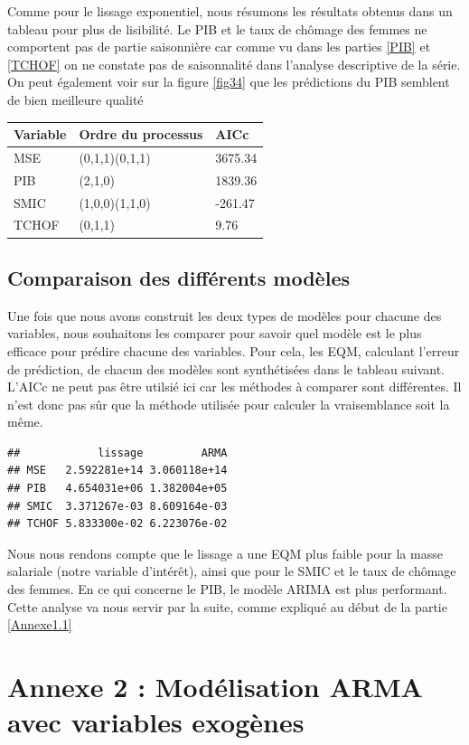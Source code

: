 \documentclass[11pt,]{article}
\begin{document}
Comme pour le lissage exponentiel, nous résumons les résultats obtenus
dans un tableau pour plus de lisibilité. Le PIB et le taux de chômage
des femmes ne comportent pas de partie saisonnière car comme vu dans les
parties \ref{PIB} et \ref{TCHOF} on ne constate pas de saisonnalité dans
l'analyse descriptive de la série. On peut également voir sur la figure
\ref{fig34} que les prédictions du PIB semblent de bien meilleure
qualité

\begin{longtable}[]{@{}lll@{}}
\toprule
Variable & Ordre du processus & AICc\tabularnewline
\midrule
\endhead
MSE & (0,1,1)(0,1,1) & 3675.34\tabularnewline
PIB & (2,1,0) & 1839.36\tabularnewline
SMIC & (1,0,0)(1,1,0) & -261.47\tabularnewline
TCHOF & (0,1,1) & 9.76\tabularnewline
\bottomrule
\end{longtable}

\subsection{Comparaison des différents
modèles}\label{comparaison-des-differents-modeles-1}

Une fois que nous avons construit les deux types de modèles pour chacune
des variables, nous souhaitons les comparer pour savoir quel modèle est
le plus efficace pour prédire chacune des variables. Pour cela, les EQM,
calculant l'erreur de prédiction, de chacun des modèles sont
synthétisées dans le tableau suivant. L'AICc ne peut pas être utilsié
ici car les méthodes à comparer sont différentes. Il n'est donc pas sûr
que la méthode utilisée pour calculer la vraisemblance soit la même.

\begin{verbatim}
##            lissage         ARMA
## MSE   2.592281e+14 3.060118e+14
## PIB   4.654031e+06 1.382004e+05
## SMIC  3.371267e-03 8.609164e-03
## TCHOF 5.833300e-02 6.223076e-02
\end{verbatim}

Nous nous rendons compte que le lissage a une EQM plus faible pour la
masse salariale (notre variable d'intérêt), ainsi que pour le SMIC et le
taux de chômage des femmes. En ce qui concerne le PIB, le modèle ARIMA
est plus performant. Cette analyse va nous servir par la suite, comme
expliqué au début de la partie \ref{Annexe1.1}

\section{\texorpdfstring{Annexe 2 : Modélisation ARMA avec variables
exogènes
\label{Annexe2}}{Annexe 2 : Modélisation ARMA avec variables exogènes }}\label{annexe-2-modelisation-arma-avec-variables-exogenes}
\end{document}
